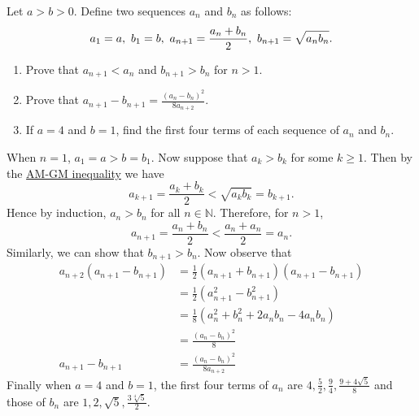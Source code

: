 \begin{question}
    Let $a > b > 0$. Define two sequences $a_{n}$ and $b_{n}$ as follows:
    \[a_{1} = a,\text{\space} b_{1} = b,\text{\space} a_{n + 1} = \frac{a_{n} +
    b_{n}}{2},\text{\space} b_{n + 1} = \sqrt{a_{n}b_{n}}.\]
    \begin{enumerate}
        \item Prove that $a_{n + 1} < a_{n}$ and $b_{n + 1} > b_{n}$ for $n >
            1$. 
        
        \item Prove that $a_{n + 1} - b_{n + 1} = \frac{(a_{n} -
            b_{n})^2}{8a_{n + 2}}$. 
        
        \item If $a = 4$ and $b = 1$, find the first four terms of each
            sequence of $a_{n}$ and $b_{n}$.
    \end{enumerate}
\end{question}
\begin{solution}
    When $n = 1$, $a_1 = a > b = b_1$. Now suppose that $a_k > b_k$ for some $k
    \geq 1$. Then by the \hyperref[thm: amgm]{AM-GM inequality} we have 
    \[ a_{k + 1} = \frac{a_{k} + b_{k}}{2} < \sqrt{a_{k}b_{k}} =
    b_{k + 1}. \]
    Hence by induction, $a_n > b_n$ for all $n \in \mathbb{N}$. Therefore, for $n > 1$,
    \[ a_{n + 1} = \frac{a_n + b_n}{2} < \frac{a_n + a_n}{2} = a_n. \]
    Similarly, we can show that $b_{n + 1} > b_n$.
    Now observe that
    \begin{align*}
        a_{n + 2}(a_{n + 1} - b_{n + 1}) &= \frac{1}{2}(a_{n + 1} + b_{n + 1})(a_{n + 1} - b_{n + 1})\\
        &= \frac{1}{2}(a_{n + 1}^2 - b_{n + 1}^2)\\
        &= \frac{1}{8}(a_n^2 + b_n^2 + 2a_nb_n - 4a_nb_n)\\
        &= \frac{(a_n - b_n)^2}{8}\\
        a_{n + 1} - b_{n + 1} &= \frac{(a_n - b_n)^2}{8a_{n + 2}}
    \end{align*} 
    Finally when $a = 4$ and $b = 1$, the first four terms of $a_n$ are $4,
    \frac{5}{2}, \frac{9}{4}, \frac{9 + 4\sqrt{5}}{8}$ and those of $b_n$ are
    $1, 2, \sqrt{5}, \frac{3
    \sqrt[4]{5}}{2}$.
\end{solution}

